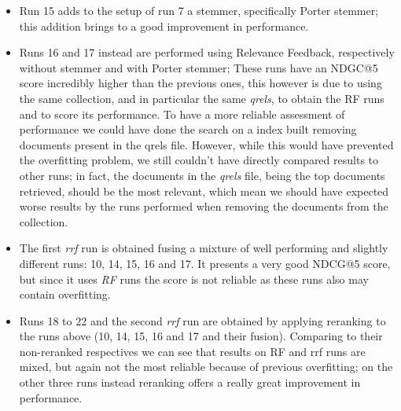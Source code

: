 \begin{itemize}
\item Run 15 adds to the setup of run 7 a stemmer, specifically Porter stemmer; this addition brings to a good improvement in performance.

\item Runs 16 and 17 instead are performed using Relevance Feedback, respectively without stemmer and with Porter stemmer; These runs have an NDGC@5 score incredibly higher than the previous ones, this however is due to using the same collection, and in particular the same \textit{qrels}, to obtain the RF runs and to score its performance.
To have a more reliable assessment of performance we could have done the search on a index built removing documents present in the qrels file. However, while this would have prevented the overfitting problem, we still couldn't have directly compared results to other runs; in fact, the documents in the \textit{qrels} file, being the top documents retrieved, should be the most relevant, which mean we should have expected worse results by the runs performed when removing the documents from the collection.

\item The first \textit{rrf} run is obtained fusing a mixture of well performing and slightly different runs: 10, 14, 15, 16 and 17. It presents a very good NDCG@5 score, but since it uses \textit{RF} runs the score is not reliable as these runs also may contain overfitting.

\item Runs 18 to 22 and the second \textit{rrf} run are obtained by applying reranking to the runs above (10, 14, 15, 16 and 17 and their fusion).
Comparing to their non-reranked respectives we can see that results on RF and rrf runs are mixed, but again not the most reliable because of previous overfitting; on the other three runs instead reranking offers a really great improvement in performance.

\end{itemize}